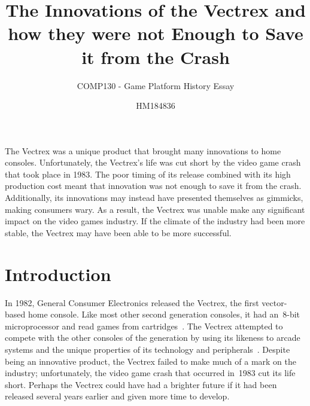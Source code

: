 \documentclass{scrartcl}
\title{The Innovations of the Vectrex and how they were not Enough to Save it from the Crash}
\subtitle{COMP130 - Game Platform History Essay}
\author{HM184836}
\begin{document}
\maketitle


\abstract
{
The Vectrex was a unique product that brought many innovations to home consoles. Unfortunately, the Vectrex's life was cut short by the video game crash that took place in 1983. The poor timing of its release combined with its high production cost meant that innovation was not enough to save it from the crash. Additionally, its innovations may instead have presented themselves as gimmicks, making consumers wary. As a result, the Vectrex was unable make any significant impact on the video games industry. If the climate of the industry had been more stable, the Vectrex may have been able to be more successful.

}



\section*{Introduction}
In 1982, General Consumer Electronics released the Vectrex, the first vector-based home console. Like most other second generation consoles, it had an~8-bit microprocessor and read games from cartridges~\cite{vectrex:manual}. The Vectrex attempted to compete with the other consoles of the generation by using its likeness to arcade systems and the unique properties of its technology and peripherals~\cite{vectrex:advert}. Despite being an innovative product, the Vectrex failed to make much of a mark on the industry; unfortunately, the video game crash that occurred in~1983 cut its life short. Perhaps the Vectrex could have had a brighter future if it had been released several years earlier and given more time to develop.

\end{document}
